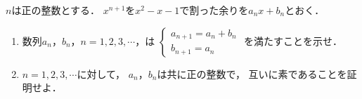 \documentclass[../../main.tex]{subfiles}
\begin{document}
$n$は正の整数とする．
$x^{n+1}$を$x^2-x-1$で割った余りを$a_nx+b_n$とおく．
\begin{enumerate}
  \item 数列$a_n$，$b_n$，$n=1,2,3,\cdots$，は
    $
    \begin{cases}
      a_{n+1}=a_n+b_n \\
      b_{n+1}=a_n
    \end{cases}$
    を満たすことを示せ．
  \item $n=1,2,3,\cdots$に対して，
    $a_n$，$b_n$は共に正の整数で，
    互いに素であることを証明せよ．
\end{enumerate}
\end{document}

